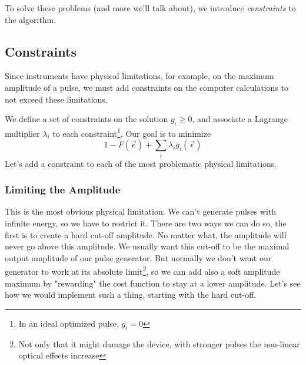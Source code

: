 To solve these problems (and more we'll talk about), we introduce \textit{constraints} to the algorithm.

\subsection{Constraints}
Since instruments have physical limitations, for example, on the maximum amplitude of a pulse, we must add constraints on the computer calculations to not exceed these limitations.

We define a set of constraints on the solution ${g_i \ge 0}$, and associate a Lagrange multiplier $\lambda_i$ to each constraint\footnote{In an ideal optimized pulse, $g_i = 0$}. \newline
Our goal is to minimize 
$$1 - F (\vec{\epsilon}) + \sum_i \lambda_i g_i (\vec{\epsilon})$$
Let's add a constraint to each of the most problematic physical limitations.
\subsubsection{Limiting the Amplitude}
This is the most obvious physical limitation. We can't generate pulses with infinite energy, so we have to restrict it. There are two ways we can do so, the first is to create a hard cut-off amplitude. No matter what, the amplitude will never go above this amplitude. We usually want this cut-off to be the  maximal output amplitude of our pulse generator. But normally we don't want our generator to work at its absolute limit\footnote{Not only that it might damage the device, with stronger pulses the non-linear optical effects increase}, so we can add also a soft amplitude maximum by "rewarding" the cost function to stay at a lower amplitude. Let's see how we would implement such a thing, starting with the hard cut-off.


